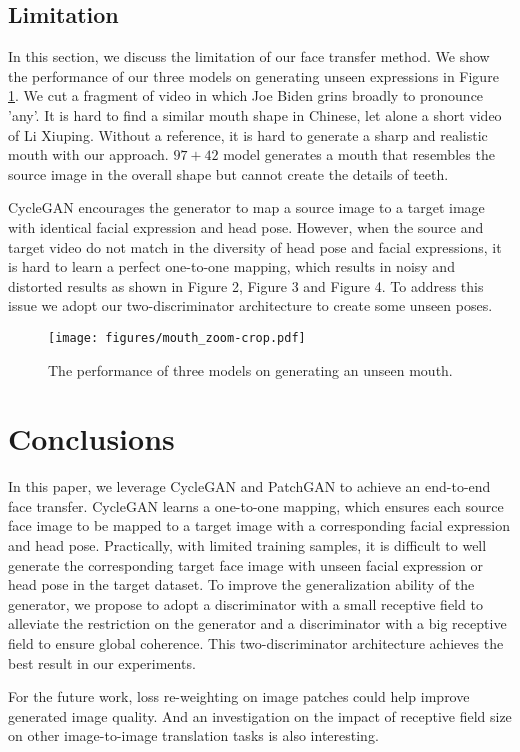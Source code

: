 \documentclass[letterpaper]{article} %
\begin{document}
	\subsection{Limitation}
	
	In this section, we discuss the limitation of our face transfer method. We show the performance of our three models on generating unseen expressions in Figure \ref{fig:mouth}. We cut a fragment of video in which Joe Biden grins broadly to pronounce 'any'. It is hard to find a similar mouth shape in Chinese, let alone a short video of Li Xiuping. Without a reference, it is hard to generate a sharp and realistic mouth with our approach. $97+42$ model generates a mouth that resembles the source image in the overall shape but cannot create the details of teeth. 
	
	CycleGAN encourages the generator to map a source image to a target image with identical facial expression and head pose. However, when the source and target video do not match in the diversity of head pose and facial expressions, it is hard to learn a perfect one-to-one mapping, which results in noisy and distorted results as shown in Figure 2, Figure 3 and Figure 4. To address this issue we adopt our two-discriminator architecture to create some unseen poses. 
	
	
	
	
	\begin{figure}[t]
		\centering
		\vspace{3.5pt}
		\texttt{[image: figures/mouth\_zoom-crop.pdf]}\\
		\caption{The performance of three models on generating an unseen mouth. } \label{fig:mouth}
		\vspace{0pt}
	\end{figure}
	
	\section{Conclusions}
	In this paper, we leverage CycleGAN and PatchGAN to achieve an end-to-end face transfer. CycleGAN learns a one-to-one mapping, which ensures each source face image to be mapped to a target image with a corresponding facial expression and head pose.
	Practically, with limited training samples, it is difficult to well generate the corresponding target face image with unseen facial expression or head pose in the target dataset. To improve the generalization ability of the generator, we propose to adopt a discriminator with a small receptive field to alleviate the restriction on the generator and a discriminator with a big receptive field to ensure global coherence. This two-discriminator architecture achieves the best result in our experiments.
	
	For the future work, loss re-weighting on image patches could help improve generated image quality. And an investigation on the impact of receptive field size on other image-to-image translation tasks is also interesting.%
	
	
	
	
	
	
\end{document}
